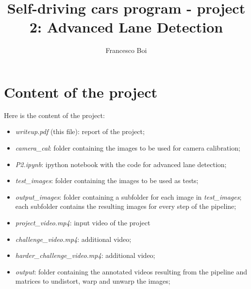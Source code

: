 \documentclass{article}
\author{Francesco Boi}
\title{Self-driving cars program - project  2: Advanced Lane Detection}
\date{}
\begin{document}

\maketitle
\tableofcontents 

\lstset{escapechar=ç,style=customc}
\section{Content of the project}
Here is the content of the project:
\begin{itemize}
\item \textit{writeup.pdf} (this file): report of the project;
\item \textit{camera\_cal}: folder containing the images to be used for camera calibration;
\item \textit{P2.ipynb}: ipython notebook with the code for advanced lane detection;
\item \textit{test\_images}: folder containing the images to be used as tests;
\item \textit{output\_images}: folder containing a subfolder for each image in \textit{test\_images}; each subfolder contains the resulting images for every step of the pipeline;
\item \textit{project\_video.mp4}: input video of the project
\item \textit{challenge\_video.mp4}: additional video;
\item \textit{harder\_challenge\_video.mp4}: additional video;
\item \textit{output}: folder containing the annotated videos resulting from the pipeline and matrices to undistort, warp and unwarp the images;
\end{itemize}
\end{document}
